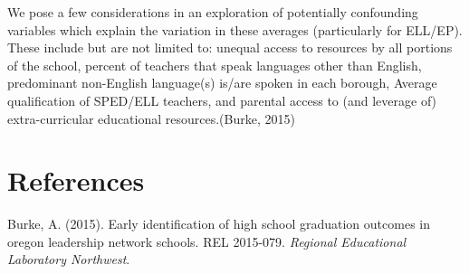 \documentclass[
  english,
  man, fleqn, noextraspace]{apa6}
\begin{document}
We pose a few considerations in an exploration of potentially confounding variables which explain the variation in these averages (particularly for ELL/EP). These include but are not limited to: unequal access to resources by all portions of the school, percent of teachers that speak languages other than English, predominant non-English language(s) is/are spoken in each borough, Average qualification of SPED/ELL teachers, and parental access to (and leverage of) extra-curricular educational resources.(Burke, 2015)

\newpage

\hypertarget{references}{%
\section{References}\label{references}}

\begingroup
\setlength{\parindent}{-0.5in}
\setlength{\leftskip}{0.5in}

\hypertarget{refs}{}
\leavevmode\hypertarget{ref-burke2015early}{}%
Burke, A. (2015). Early identification of high school graduation outcomes in oregon leadership network schools. REL 2015-079. \emph{Regional Educational Laboratory Northwest}.

\endgroup
\end{document}
